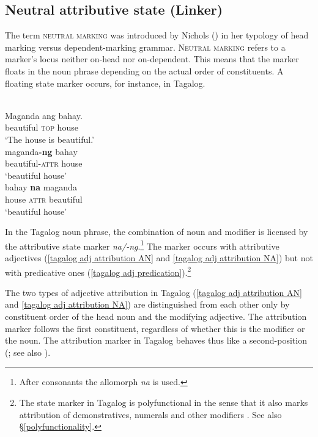 \subsection[Neutral attributive state]{Neutral attributive state (Linker)}
\label{linker}
The term \textsc{neutral marking} was introduced by Nichols (\citeyear{nichols1986}) in her typology of head marking versus dependent\hyp{}marking grammar. \textsc{Neutral marking} refers to a marker's locus neither on-head nor on-dependent. This means that the marker floats in the noun phrase depending on the actual order of constituents. A floating state marker occurs, for instance, in Tagalog.
\begin{exe} 
\ex
\label{tagalog linker}
\begin{xlist}
\\
\label{tagalog adj predication}
\gll Maganda ang bahay.\\
	beautiful \textsc{top} house\\
\glt	‘The house is beautiful.’
\\
\label{tagalog adj attribution AN}
\gll maganda\textbf{-ng} bahay\\
	beautiful-\textsc{attr} house\\
\glt	‘beautiful house’
\\
\label{tagalog adj attribution NA}
\gll bahay \textbf{na} maganda\\
	house \textsc{attr} beautiful\\
\glt	‘beautiful house’
\end{xlist}
\end{exe}
In the Tagalog noun phrase, the combination of noun and modifier is licensed by the attributive state marker \textit{na/-ng}.\footnote{After consonants the allomorph \textit{na} is used.} The marker occurs with attributive adjectives (\ref{tagalog adj attribution AN} and \ref{tagalog adj attribution NA}) but not with predicative ones (\ref{tagalog adj predication}).\footnote{The state marker in Tagalog is polyfunctional in the sense that it also marks attribution of demonstratives, numerals and other modifiers \citep[160–161]{himmelmann1997}. See also \S\ref{polyfunctionality}.}

The two types of adjective attribution in Tagalog (\ref{tagalog adj attribution AN} and \ref{tagalog adj attribution NA}) are distinguished from each other only by constituent order of the head noun and the modifying adjective. The attribution marker follows the first constituent, regardless of whether this is the modifier or the noun. The attribution marker in Tagalog behaves thus like a second-position  (\citealt[65]{nichols1986}; see also \citealt[160, 162]{himmelmann1997}).

